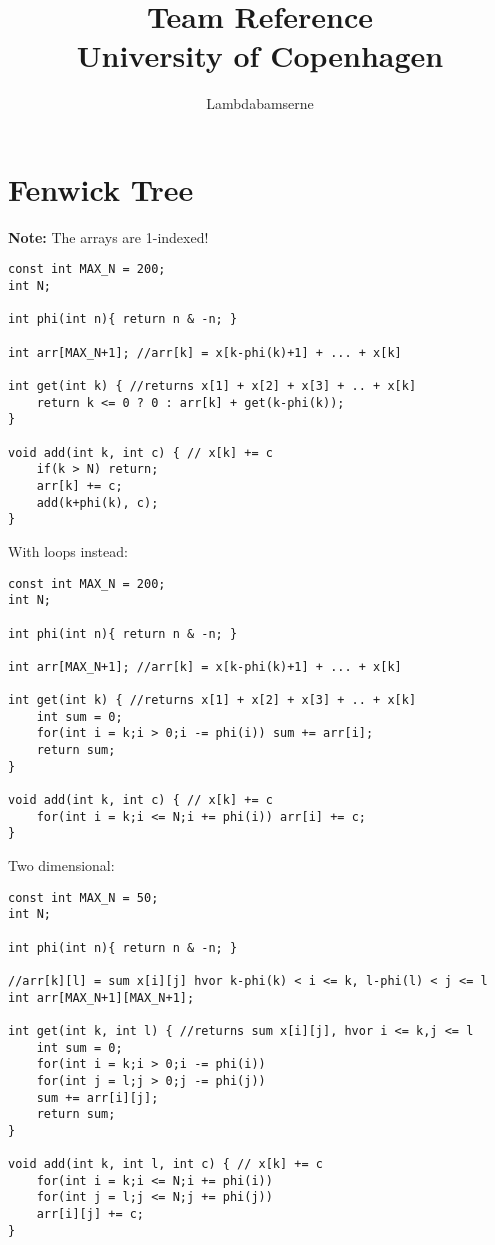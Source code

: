 \documentclass[a4paper,final,8pt]{article}
\title{Team Reference \\ University of Copenhagen}
\author{Lambdabamserne}
\begin{document}
\maketitle

\tableofcontents

\section{Fenwick Tree}

\textbf{Note:} The arrays are 1-indexed!

\begin{lstlisting}
const int MAX_N = 200;
int N;

int phi(int n){ return n & -n; }

int arr[MAX_N+1]; //arr[k] = x[k-phi(k)+1] + ... + x[k]

int get(int k) { //returns x[1] + x[2] + x[3] + .. + x[k]
    return k <= 0 ? 0 : arr[k] + get(k-phi(k));
}

void add(int k, int c) { // x[k] += c
    if(k > N) return;
    arr[k] += c;
    add(k+phi(k), c);
}
\end{lstlisting}

With loops instead:

\begin{lstlisting}
const int MAX_N = 200;
int N;

int phi(int n){ return n & -n; }

int arr[MAX_N+1]; //arr[k] = x[k-phi(k)+1] + ... + x[k]

int get(int k) { //returns x[1] + x[2] + x[3] + .. + x[k]
    int sum = 0;
    for(int i = k;i > 0;i -= phi(i)) sum += arr[i];
    return sum;
}

void add(int k, int c) { // x[k] += c
    for(int i = k;i <= N;i += phi(i)) arr[i] += c;
}
\end{lstlisting}


Two dimensional:

\begin{lstlisting}
const int MAX_N = 50;
int N;

int phi(int n){ return n & -n; }

//arr[k][l] = sum x[i][j] hvor k-phi(k) < i <= k, l-phi(l) < j <= l
int arr[MAX_N+1][MAX_N+1];

int get(int k, int l) { //returns sum x[i][j], hvor i <= k,j <= l
    int sum = 0;
    for(int i = k;i > 0;i -= phi(i))
    for(int j = l;j > 0;j -= phi(j))
    sum += arr[i][j];
    return sum;
}

void add(int k, int l, int c) { // x[k] += c
    for(int i = k;i <= N;i += phi(i))
    for(int j = l;j <= N;j += phi(j))
    arr[i][j] += c;
}
\end{lstlisting}
\end{document}
